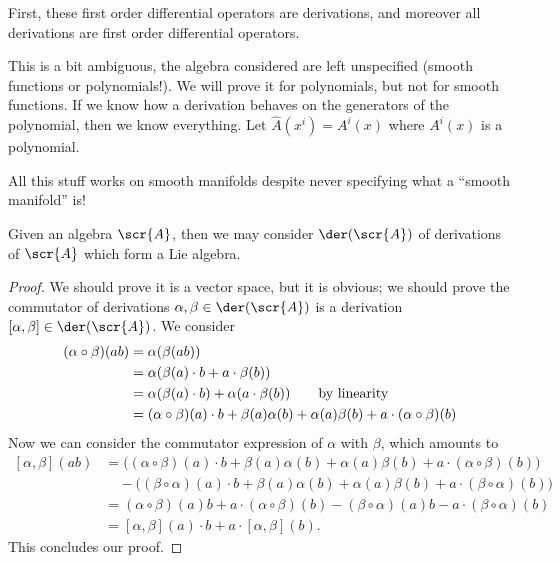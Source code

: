 First, these first order differential operators are derivations,
and moreover all derivations are first order differential
operators.

This is a bit ambiguous, the algebra considered are left
unspecified (smooth functions or polynomials!). We will prove it
for polynomials, but not for smooth functions. If we know how a
derivation behaves on the generators of the polynomial, then we
know everything. Let $\widehat{A}(x^i)=A^i(x)$ where $A^i(x)$ is
a polynomial.

\begin{rmk}
All this stuff works on smooth manifolds despite never specifying
what a ``smooth manifold'' is!
\end{rmk}

\begin{thm}
Given an algebra $\scr{A}$, then we may consider $\der(\scr{A})$
of derivations of $\scr{A}$ which form a Lie algebra.
\end{thm}
\begin{proof}
We should prove it is a vector space, but it is obvious; we
should prove the commutator of derivations
$\alpha,\beta\in\der(\scr{A})$ is a derivation
$[\alpha,\beta]\in\der(\scr{A})$. We consider
\begin{subequations}
\begin{align}
(\alpha\circ\beta)(ab)&=\alpha(\beta(ab))\\
&=\alpha(\beta(a)\cdot b+a\cdot\beta(b))\\
&=\alpha(\beta(a)\cdot b)+\alpha(a\cdot \beta(b))\qquad\hbox{by linearity}\\
&=(\alpha\circ\beta)(a)\cdot b+\beta(a)\alpha(b)+\alpha(a)\beta(b)+a\cdot(\alpha\circ\beta)(b)
\end{align}
\end{subequations}
Now we can consider the commutator expression of $\alpha$ with
$\beta$, which amounts to
\begin{subequations}
\begin{align}
[\alpha,\beta](ab) &= \bigg((\alpha\circ\beta)(a)\cdot b+\beta(a)\alpha(b)+\alpha(a)\beta(b)+a\cdot(\alpha\circ\beta)(b)\bigg)\nonumber\\
&\quad-\bigg((\beta\circ\alpha)(a)\cdot b+\beta(a)\alpha(b)+\alpha(a)\beta(b)+a\cdot(\beta\circ\alpha)(b)\bigg)\\
&=(\alpha\circ\beta)(a)b+a\cdot(\alpha\circ\beta)(b)-(\beta\circ\alpha)(a)b-a\cdot(\beta\circ\alpha)(b)\\
&=[\alpha,\beta](a)\cdot b+a\cdot[\alpha,\beta](b).
\end{align}
\end{subequations}
This concludes our proof.
\end{proof}

